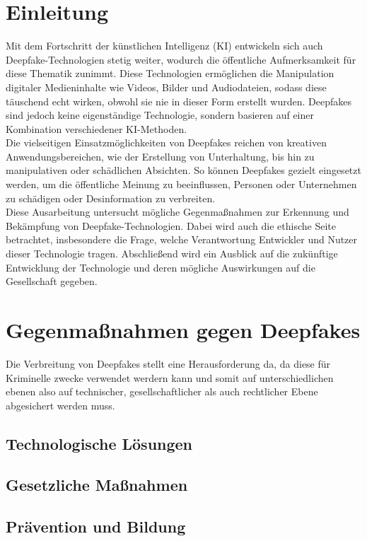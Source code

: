 \documentclass[a4paper,12pt]{article}
\begin{document}
\section{Einleitung}
Mit dem Fortschritt der künstlichen Intelligenz (KI) entwickeln sich auch Deepfake-Technologien stetig weiter, 
wodurch die öffentliche Aufmerksamkeit für diese Thematik zunimmt. 
Diese Technologien ermöglichen die Manipulation digitaler Medieninhalte wie Videos, 
Bilder und Audiodateien, sodass diese täuschend echt wirken, 
obwohl sie nie in dieser Form erstellt wurden. 
Deepfakes sind jedoch keine eigenständige Technologie, 
sondern basieren auf einer Kombination verschiedener KI-Methoden. \cite{BVDW2024}\\
Die vielseitigen Einsatzmöglichkeiten von Deepfakes reichen von kreativen Anwendungsbereichen, 
wie der Erstellung von Unterhaltung, bis hin zu manipulativen oder schädlichen Absichten. 
So können Deepfakes gezielt eingesetzt werden, um die öffentliche Meinung zu beeinflussen, 
Personen oder Unternehmen zu schädigen oder Desinformation zu verbreiten. \cite{CounterExtremism2020}\\
Diese Ausarbeitung untersucht mögliche Gegenmaßnahmen zur Erkennung und Bekämpfung von Deepfake-Technologien. 
Dabei wird auch die ethische Seite betrachtet, 
insbesondere die Frage, welche Verantwortung Entwickler und Nutzer dieser Technologie tragen. 
Abschließend wird ein Ausblick auf die zukünftige Entwicklung der Technologie und deren mögliche Auswirkungen auf die Gesellschaft gegeben.
\newpage

\section{Gegenmaßnahmen gegen Deepfakes}
Die Verbreitung von Deepfakes stellt eine Herausforderung da,
da diese für Kriminelle zwecke verwendet werdern kann und 
somit auf unterschiedlichen ebenen also auf technischer, gesellschaftlicher als auch rechtlicher Ebene abgesichert werden muss.\cite{CounterExtremism2020}

\subsection{Technologische Lösungen}

\subsection{Gesetzliche Maßnahmen}
\subsection{Prävention und Bildung}
\end{document}

